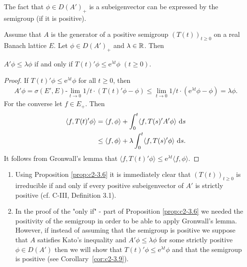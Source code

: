 The fact that $\phi \in D(A')_{+}$ is a subeigenvector can be expressed by the
semigroup (if it is positive).
\begin{proposition}\label{prop:c2-3.6}
Assume that $A$ is the generator of a positive semigroup $(T(t))_{t \geq 0}$ on a real Banach lattice $E$. 
Let $\phi \in D(A')_{+}$ and $\lambda \in \mathbb{R}$. 
Then
\begin{center}
$A'\phi \leq \lambda \phi$ if and only if  $T(t)'\phi \leq \mathrm{e}^{\lambda t}\phi$ $(t \geq 0)$.
\end{center}
\end{proposition}
\begin{proof}
If $T(t)'\phi \leq \mathrm{e}^{\lambda t} \phi$ for all $t \geq 0$, then
\begin{align*}
A'\phi = \sigma(E',E)\text{-}\lim_{t \to 0} 1/t \cdot (T(t)'\phi - \phi) \leq \lim_{t \to 0} 1/t \cdot (\mathrm{e}^{\lambda t}\phi - \phi) = \lambda\phi.
\end{align*}
For the converse let $f \in E_{+}$. Then
\begin{align*}
\langle f,T(t)'\phi \rangle &= \langle f,\phi \rangle + \int_{0}^{t} \langle f,T(s)'A'\phi \rangle \, \mathop{}\!\mathrm{d}{s}\\
&\leq \langle f,\phi \rangle + \lambda \int_{0}^{t} \langle f,T(s)'\phi \rangle \, \mathop{}\!\mathrm{d}{s}.
\end{align*}
It follows from Gronwall's lemma that $\langle f,T(t)'\phi \rangle \leq \mathrm{e}^{\lambda t} \langle f,\phi \rangle$.
\end{proof}
\begin{remark}\label{rem:c2-3.7}
\begin{enumerate}[\upshape (i), wide, labelsep=.5em]%
\item \label{rem:c2-3.7-1}
Using Proposition \ref{prop:c2-3.6} it is immediately clear that
$(T(t))_{t \geq 0}$ is irreducible if and only if every positive subeigenvector
of $A'$ is strictly positive (cf. C-III, Definition 3.1). 
\vspace{-5pt}
\item \label{rem:c2-3.7-2}
In the proof of the "only if" - part of Proposition \ref{prop:c2-3.6} we needed the
positivity of the semigroup in order to be able to apply Gronwall's
lemma.
However, if instead of assuming that the semigroup is positive
we suppose that $A$ satisfies Kato's inequality and $A'\phi \leq \lambda\phi$ for some strictly positive $\phi \in D(A')$ then we will show that $T(t)'\phi \leq
\mathrm{e}^{\lambda t} \phi$ and that the semigroup is positive (see Corollary~\ref{cor:c2-3.9}).
\end{enumerate}
\end{remark}
